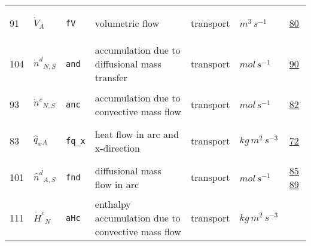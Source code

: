 \begin{longtable}{|p{1cm}|p{2.5cm}|p{4.5cm}|p{8cm}|p{3.0cm}|p{3cm}|p{1cm}|}
                 \\
            91
             & \hypertarget{"v:91"}{ $ {{\dot{V}}}{_{A}} $}
             & \verb|fV|
             & volumetric flow
             & \begin{lay}transport \end{lay}
             & $ m^{3} \,s^{-1} \, $
             &                 \hyperlink{"e:80"}{ 80 }
                 \\
            104
             & \hypertarget{"v:104"}{ $ {{\dot{n}^d}}{_{N, S}} $}
             & \verb|and|
             & accumulation due to diffusional mass transfer
             & \begin{lay}transport \end{lay}
             & $ mol \,s^{-1} \, $
             &                 \hyperlink{"e:90"}{ 90 }
                 \\
            93
             & \hypertarget{"v:93"}{ $ {{\dot{n}^c}}{_{N, S}} $}
             & \verb|anc|
             & accumulation due to convective mass flow
             & \begin{lay}transport \end{lay}
             & $ mol \,s^{-1} \, $
             &                 \hyperlink{"e:82"}{ 82 }
                 \\
            83
             & \hypertarget{"v:83"}{ $ {{\hat{q}_x}}{_{A}} $}
             & \verb|fq_x|
             & heat flow in arc and x-direction
             & \begin{lay}transport \end{lay}
             & $ kg \,m^{2} \,s^{-3} \, $
             &                 \hyperlink{"e:72"}{ 72 }
                 \\
            101
             & \hypertarget{"v:101"}{ $ {{\hat{n}^d}}{_{A, S}} $}
             & \verb|fnd|
             & diffusional mass flow in arc
             & \begin{lay}transport \end{lay}
             & $ mol \,s^{-1} \, $
             &                 \hyperlink{"e:85"}{ 85 }
                                 \hyperlink{"e:89"}{ 89 }
                 \\
            111
             & \hypertarget{"v:111"}{ $ {{\dot{H}^c}}{_{N}} $}
             & \verb|aHc|
             & enthalpy accumulation due to convective mass flow
             & \begin{lay}transport \end{lay}
             & $ kg \,m^{2} \,s^{-3} \, $

\end{longtable}
